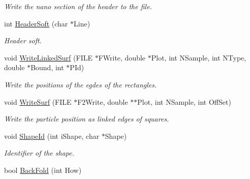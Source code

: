 \begin{DoxyCompactItemize}
\begin{DoxyCompactList}\small\item\em Write the nano section of the header to the file. \end{DoxyCompactList}\item 
int \hyperlink{classVarData_ad86f36df8d1ff2f5c4e8f9bf3e43dfa3}{Header\+Soft} (char $\ast$Line)\hypertarget{classVarData_ad86f36df8d1ff2f5c4e8f9bf3e43dfa3}{}\label{classVarData_ad86f36df8d1ff2f5c4e8f9bf3e43dfa3}

\begin{DoxyCompactList}\small\item\em Header soft. \end{DoxyCompactList}\item 
void \hyperlink{classVarData_afaf46d635173dcc718ad3eb8870d4b91}{Write\+Linked\+Surf} (F\+I\+LE $\ast$F\+Write, double $\ast$Plot, int N\+Sample, int N\+Type, double $\ast$Bound, int $\ast$P\+Id)\hypertarget{classVarData_afaf46d635173dcc718ad3eb8870d4b91}{}\label{classVarData_afaf46d635173dcc718ad3eb8870d4b91}

\begin{DoxyCompactList}\small\item\em Write the positions of the egdes of the rectangles. \end{DoxyCompactList}\item 
void \hyperlink{classVarData_a05977dbae3f034b4371646d6c1afbdcd}{Write\+Surf} (F\+I\+LE $\ast$F2\+Write, double $\ast$$\ast$Plot, int N\+Sample, int Off\+Set)\hypertarget{classVarData_a05977dbae3f034b4371646d6c1afbdcd}{}\label{classVarData_a05977dbae3f034b4371646d6c1afbdcd}

\begin{DoxyCompactList}\small\item\em Write the particle position as linked edges of squares. \end{DoxyCompactList}\item 
void \hyperlink{classVarData_a3043b04de19ff9f50f6253ecbdf316bd}{Shape\+Id} (int i\+Shape, char $\ast$Shape)\hypertarget{classVarData_a3043b04de19ff9f50f6253ecbdf316bd}{}\label{classVarData_a3043b04de19ff9f50f6253ecbdf316bd}

\begin{DoxyCompactList}\small\item\em Identifier of the shape. \end{DoxyCompactList}\item 
bool \hyperlink{classVarData_a76c0ae2bedaaafb3da1cb7019035b602}{Back\+Fold} (int How)\hypertarget{classVarData_a76c0ae2bedaaafb3da1cb7019035b602}{}\label{classVarData_a76c0ae2bedaaafb3da1cb7019035b602}


\end{DoxyCompactItemize}
